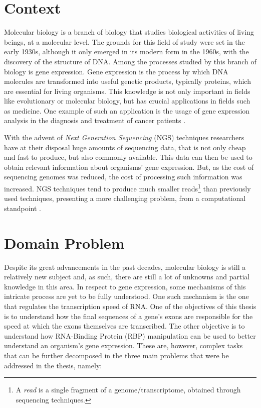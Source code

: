 \documentclass[9pt,a4paper]{extarticle}
\begin{document}
\begin{multicols}{2}

\section{Context} \label{sec:context}

Molecular biology is a branch of biology that studies biological activities of
living beings, at a molecular level. The grounds for this field of study were
set in the early 1930s, although it only emerged in its modern form in the
1960s, with the discovery of the structure of DNA. Among the processes studied
by this branch of biology is gene expression. Gene expression is the process by
which DNA molecules are transformed into useful genetic products, typically
proteins, which are essential for living organisms. This knowledge is not only
important in fields like evolutionary or molecular biology, but has crucial
applications in fields such as medicine. One example of such an application is
the usage of gene expression analysis in the diagnosis and treatment of cancer
patients \cite{Pusztai01062003}.

With the advent of \textit{Next Generation Sequencing} (NGS) techniques
researchers have at their disposal huge amounts of sequencing data, that is not
only cheap and fast to produce, but also commonly available. This data can then
be used to obtain relevant information about organisms' gene expression. But, as
the cost of sequencing genomes was reduced, the cost of processing such
information was increased. NGS techniques tend to produce much smaller
reads\footnote{A \textit{read} is a single fragment of a genome/transcriptome,
obtained through sequencing techniques.} than previously used techniques,
presenting a more challenging problem, from a computational standpoint
\cite{Wolf2013}.

\section{Domain Problem} \label{sec:problem}

Despite its great advancements in the past decades, molecular biology is still a
relatively new subject and, as such, there are still a lot of unknowns and
partial knowledge in this area. In respect to gene expression, some mechanisms
of this intricate process are yet to be fully understood. One such mechanism is
the one that regulates the transcription speed of RNA. One of the objectives of
this thesis is to understand how the final sequences of a gene's exons are
responsible for the speed at which the exons themselves are transcribed. The
other objective is to understand how RNA-Binding Protein (RBP) manipulation can
be used to better understand an organism's gene expression. These are, however,
complex tasks that can be further decomposed in the three main problems that
were be addressed in the thesis, namely:


\end{multicols}
\end{document}
